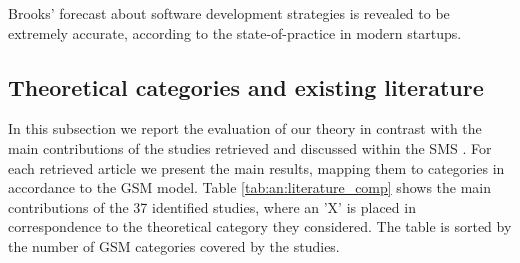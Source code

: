 \documentclass[10pt,journal,letterpaper,compsoc]{IEEEtran}
\begin{document}
Brooks' forecast about software development strategies is revealed to be
extremely accurate, according to the state-of-practice in modern startups.
\subsection{Theoretical categories and existing literature}
\label{sect:theory:validation:sms}

In this subsection we report the evaluation of our theory in contrast with the
main contributions of the studies retrieved and discussed within the SMS
\cite{SMS}. For each retrieved article we present the main results, mapping them
to categories in accordance to the GSM model. Table \ref{tab:an:literature_comp}
shows the main contributions of the 37 identified studies, where an 'X' is
placed in correspondence to the theoretical category they considered. The table
is sorted by the number of GSM categories covered by the studies.
\end{document}

